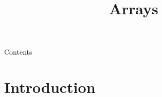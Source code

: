 
\usepackage{tikz}
\usepackage{hyperref}
\newcommand{\topic}{
	Arrays
}
\title{\topic}
\supertitle{\course}
\date{}



\maketitle

\begin{frame}{Contents}
	\tableofcontents
\end{frame}

\section{Introduction}
